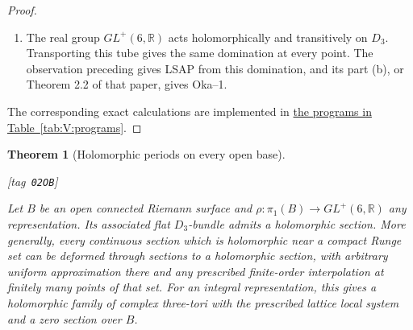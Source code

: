 \documentclass[11pt,a4paper]{article}
\numberwithin{equation}{section}
\newtheorem{theorem}{Theorem}[section]
\theoremstyle{definition}
\newcommand{\StatementRecord}[4]{{\upshape\footnotesize[tag~\texttt{#3}]}\enspace\ignorespaces}
\begin{document}
\begin{proof}
\begin{enumerate}[label=\arabic*.]
\item The real group $GL^+(6,\mathbb R)$ acts holomorphically and
transitively on $D_3$.  Transporting this tube gives the same
domination at every point.  The observation preceding
\cite[Proposition 7.13 and preceding paragraph, pp.~23--24]{IVVOkaOneV5} gives LSAP from
this domination, and its part (b), or Theorem 2.2 of that paper,
gives Oka--1.

\end{enumerate}
The corresponding exact calculations are implemented in \hyperlink{prog:V:tubes}{the programs in Table~\ref*{tab:V:programs}}.
\end{proof}




\begin{theorem}[Holomorphic periods on every open base]\hypertarget{tag-02OB}{}\label{maps:src:F.3.9}
\StatementRecord{maps:src:F.3.9}{proved}{02OB}{\cref{maps:src:F.3.8}; \cite[Proposition 7.13(d), p.~24]{IVVOkaOneV5}}


Let $B$ be an open connected Riemann surface and
$\rho:\pi_1(B)\to GL^+(6,\mathbb R)$ any representation.
Its associated flat $D_3$-bundle admits a holomorphic section.
More generally, every continuous section which is holomorphic
near a compact Runge set can be deformed through sections to a
holomorphic section, with arbitrary uniform approximation there
and any prescribed finite-order interpolation at finitely many
points of that set.  For an integral representation, this gives
a holomorphic family of complex three-tori with the prescribed
lattice local system and a zero section over $B$.

\end{theorem}
\end{document}
